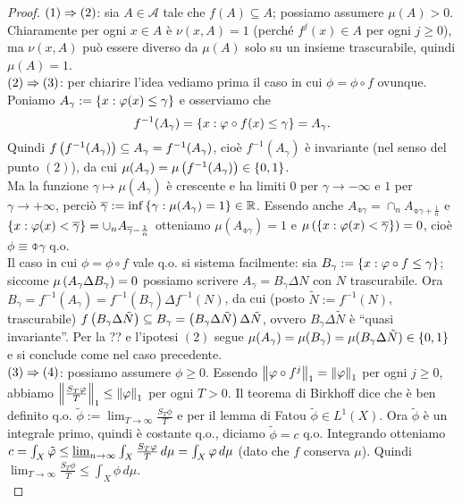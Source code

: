 \begin{proof}$(1)\Rightarrow(2)$: sia $A\in\mathcal{A}$ tale che $f(A)\subseteq A$; possiamo assumere $\mu(A)>0$. Chiaramente per ogni $x\in A$
è $\nu(x,A)=1$ (perché $f^j(x)\in A$ per ogni $j\ge 0$), ma $\nu(x,A)$ può essere diverso da $\mu(A)$ solo su un insieme trascurabile, quindi $\mu(A)=1$. \\
$(2)\Rightarrow(3)$: per chiarire l'idea vediamo prima il caso in cui $\phi=\phi\circ f$ ovunque.
Poniamo $A_\gamma:=\left\{x:\varphi(x)\le\gamma\right\}$ e osserviamo che
\[ f^{-1}(A_\gamma)=\left\{x:\varphi\circ f(x)\le\gamma\right\}=A_\gamma. \]
Quindi $f\left(f^{-1}(A_\gamma)\right)\subseteq A_\gamma=f^{-1}(A_\gamma)$,
cioè $f^{-1}(A_\gamma)$ è invariante (nel senso del punto $(2)$),
da cui $\mu(A_\gamma)=\mu\left(f^{-1}(A_\gamma)\right)\in\left\{0,1\right\}$. \\
Ma la funzione $\gamma\mapsto\mu(A_\gamma)$ è crescente e ha limiti $0$ per $\gamma\to -\infty$ e $1$ per $\gamma\to +\infty$,
perciò $\overline{\gamma}:=\inf\left\{\gamma:\mu(A_\gamma)=1\right\}\in\mathbb{R}$. Essendo anche $A_{\obar{\gamma}}=\cap_n A_{\obar{\gamma}+\frac{1}{n}}$
e $\left\{x:\varphi(x)<\overline{\gamma}\right\}=\cup_n A_{\overline{\gamma}-\frac{1}{n}}$ otteniamo $\mu(A_{\obar{\gamma}})=1$
e $\mu\left(\left\{x:\varphi(x)<\overline{\gamma}\right\}\right)=0$, cioè $\phi\equiv\obar{\gamma}$ q.o. \\
Il caso in cui $\phi=\phi\circ f$ vale q.o. si sistema facilmente: sia $B_\gamma:=\left\{x:\varphi\circ f\le\gamma\right\}$;
siccome $\mu\left(A_\gamma\Delta B_\gamma\right)=0$ possiamo scrivere $A_\gamma=B_\gamma\Delta N$ con $N$ trascurabile.
Ora $B_\gamma=f^{-1}(A_\gamma)=f^{-1}(B_\gamma)\Delta f^{-1}(N)$, da cui
(posto $\tilde{N}:=f^{-1}(N)$, trascurabile) $f\left(B_\gamma\Delta\tilde{N}\right)\subseteq B_\gamma=\left(B_\gamma\Delta\tilde{N}\right)\Delta\tilde{N}$,
ovvero $B_\gamma\Delta\tilde{N}$ è ``quasi invariante''. Per la ?? e l'ipotesi $(2)$ segue
$\mu(A_\gamma)=\mu(B_\gamma)=\mu(B_\gamma\Delta\tilde{N})\in\left\{0,1\right\}$ e si conclude come nel caso precedente. \\
$(3)\Rightarrow (4)$: possiamo assumere $\phi\ge 0$.
Essendo $\left\|\varphi\circ f^j\right\|_1=\left\|\varphi\right\|_1$ per ogni $j\ge 0$, abbiamo $\left\|\frac{S_T\varphi}{T}\right\|_1\le \left\|\varphi\right\|_1$ per ogni $T>0$.
Il teorema di Birkhoff dice che è ben definito q.o. $\tilde{\phi}:=\lim_{T\to\infty}\frac{S_T\phi}{T}$ e per il lemma di Fatou $\tilde{\phi}\in L^1(X)$.
Ora $\tilde{\phi}$ è un integrale primo, quindi è costante q.o., diciamo $\tilde{\phi}=c$ q.o. Integrando otteniamo $c=\int_X\tilde{\varphi}
\le\underline{\lim}_{n\to\infty}\int_X\frac{S_T\varphi}{T}\,d\mu=\int_X\varphi\,d\mu$ (dato che $f$ conserva $\mu$). Quindi $\lim_{T\to\infty}\frac{S_T\phi}{T}\le \int_X\phi\,d\mu$. \\

\end{proof}
